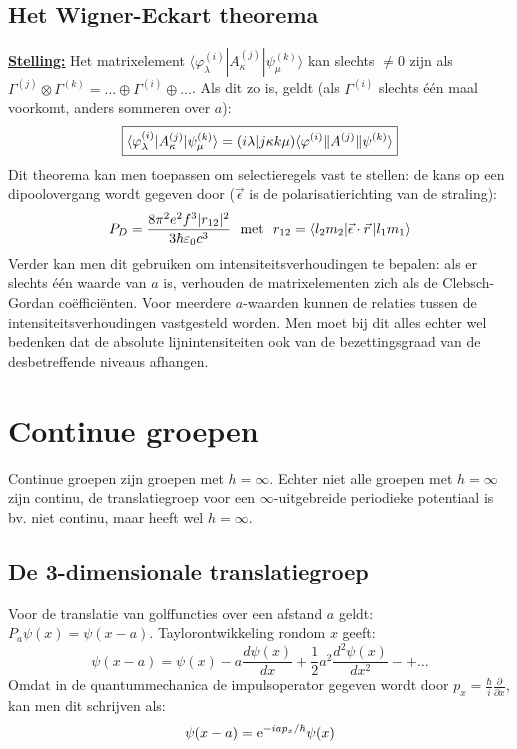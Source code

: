 \subsection{Het Wigner-Eckart theorema}
\underline{\bf Stelling:} Het matrixelement
$\langle\varphi^{(i)}_{\lambda}|A^{(j)}_{\kappa}|\psi^{(k)}_{\mu}\rangle$ kan
slechts $\neq0$ zijn als $\Gamma^{(j)}\otimes\Gamma^{(k)}=\ldots\oplus\Gamma^{(i)}\oplus\ldots$.
Als dit zo is, geldt (als $\Gamma^{(i)}$ slechts \'e\'en maal voorkomt, anders
sommeren over $a$):
\[
\mbox{\fbox{$\displaystyle
\langle\varphi^{(i)}_{\lambda}|A^{(j)}_{\kappa}|\psi^{(k)}_{\mu}\rangle=
(i\lambda|j\kappa k\mu)\langle\varphi^{(i)}\|A^{(j)}\|\psi^{(k)}\rangle
$}}
\]
Dit theorema kan men toepassen om selectieregels vast te stellen: de kans
op een dipoolovergang wordt gegeven door ($\vec{\epsilon}$ is de polarisatierichting
van de straling):
\[
P_D=\frac{8\pi^2e^2f^3|r_{12}|^2}{3\hbar\varepsilon_0c^3}
~~\mbox{met}~~r_{12}=\langle l_2m_2|\vec{\epsilon}\cdot\vec{r}\,|l_1m_1\rangle
\]
Verder kan men dit gebruiken om intensiteitsverhoudingen te bepalen: als er
slechts \'e\'en waarde van $a$ is, verhouden de matrixelementen zich als de
Clebsch-Gordan co\"effici\"enten. Voor meerdere $a$-waarden kunnen de relaties
tussen de intensiteitsverhoudingen vastgesteld worden. Men moet bij dit alles
echter wel bedenken dat de absolute lijnintensiteiten ook van de
bezettingsgraad van de desbetreffende niveaus afhangen.

\section{Continue groepen}
Continue groepen zijn groepen met $h=\infty$. Echter niet alle groepen met
$h=\infty$ zijn continu, de translatiegroep voor een $\infty$-uitgebreide
periodieke potentiaal is bv. niet continu, maar heeft wel $h=\infty$.

\subsection{De 3-dimensionale translatiegroep}
Voor de translatie van golffuncties over een afstand $a$ geldt:
$P_a\psi(x)=\psi(x-a)$. Taylorontwikkeling rondom $x$ geeft:
\[
\psi(x-a)=\psi(x)-a\frac{d\psi(x)}{dx}+\frac{1}{2}a^2\frac{d^2\psi(x)}{dx^2}-+\ldots
\]
Omdat in de quantummechanica de impulsoperator gegeven wordt door
$\displaystyle p_x=\frac{\hbar}{i}\frac{\partial}{\partial x}$, kan men dit
schrijven als:
\[
\psi(x-a)={\rm e}^{-iap_x/\hbar}\psi(x)
\]

